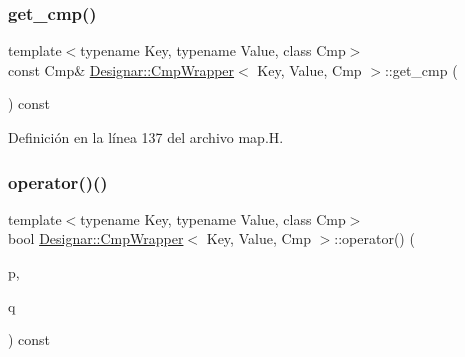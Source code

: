 \mbox{\label{class_designar_1_1_cmp_wrapper_a1f4fe6315f3f96a383be1cc51909e072}} 
\subsubsection{\texorpdfstring{get\+\_\+cmp()}{get\_cmp()}\hspace{0.1cm}{\footnotesize\ttfamily [2/2]}}
{\footnotesize\ttfamily template$<$typename Key, typename Value, class Cmp$>$ \\
const Cmp\& \hyperlink{class_designar_1_1_cmp_wrapper}{Designar\+::\+Cmp\+Wrapper}$<$ Key, Value, Cmp $>$\+::get\+\_\+cmp (\begin{DoxyParamCaption}{ }\end{DoxyParamCaption}) const\hspace{0.3cm}{\ttfamily [inline]}}



Definición en la línea 137 del archivo map.\+H.

\mbox{\label{class_designar_1_1_cmp_wrapper_a1b715375bf0bdd7ffefdb8ada447c191}} 
\subsubsection{\texorpdfstring{operator()()}{operator()()}}
{\footnotesize\ttfamily template$<$typename Key, typename Value, class Cmp$>$ \\
bool \hyperlink{class_designar_1_1_cmp_wrapper}{Designar\+::\+Cmp\+Wrapper}$<$ Key, Value, Cmp $>$\+::operator() (\begin{DoxyParamCaption}\item[{const \hyperlink{namespace_designar_a7394b1b25278abf7211e77b91eb5204f}{Map\+Key}$<$ Key, Value $>$ \&}]{p,  }\item[{const \hyperlink{namespace_designar_a7394b1b25278abf7211e77b91eb5204f}{Map\+Key}$<$ Key, Value $>$ \&}]{q }\end{DoxyParamCaption}) const\hspace{0.3cm}{\ttfamily [inline]}}



